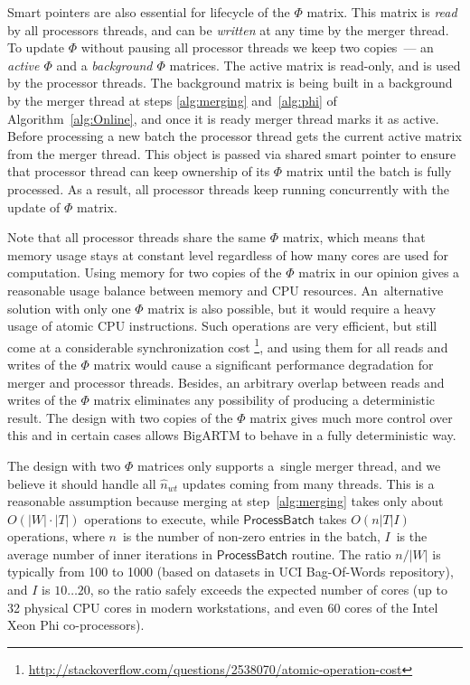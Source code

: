 \documentclass[russian]{llncs}
\newcommand{\kw}[1]{\textsf{#1}}
\begin{document}
Smart pointers are also essential for lifecycle of the $\Phi$ matrix.
This matrix is \emph{read} by all processors threads, and can be \emph{written} at any time by the merger thread.
To update $\Phi$ without pausing all processor threads we keep two copies~--- an \emph{active $\Phi$} and a \emph{background $\Phi$} matrices.
The active matrix is read-only, and is used by the processor threads.
The background matrix is being built in a background by the merger thread
at steps \ref{alg:merging} and~\ref{alg:phi} of Algorithm~\ref{alg:Online},
and once it is ready merger thread marks it as active.
Before processing a new batch the processor thread gets the current active matrix from the merger thread.
This object is passed via shared smart pointer to ensure that processor thread can keep ownership of its $\Phi$ matrix
until the batch is fully processed.
As a result, all processor threads keep running concurrently with the update of $\Phi$ matrix.

Note that all processor threads share the same $\Phi$ matrix,
which means that memory usage stays at constant level regardless of how many cores are used for computation.
Using memory for two copies of the $\Phi$ matrix in our opinion gives a reasonable usage balance between memory and CPU resources.
An~alternative solution with only one $\Phi$ matrix is also possible, but it would require a heavy usage of atomic CPU instructions.
Such operations are very efficient, but still come at a considerable synchronization cost%
\footnote{\url{http://stackoverflow.com/questions/2538070/atomic-operation-cost}},
and using them for all reads and writes of the $\Phi$ matrix would cause a significant performance degradation for merger and processor threads.
Besides, an arbitrary overlap between reads and writes of the $\Phi$ matrix eliminates any possibility of producing a deterministic result.
The design with two copies of the $\Phi$ matrix gives much more control over this
and in certain cases allows BigARTM to behave in a fully deterministic way.

The design with two $\Phi$ matrices only supports a~single merger thread,
and we believe it should handle all $\hat n_{wt}$ updates coming from many threads.
This is a reasonable assumption because
merging at step~\ref{alg:merging} takes only about $O(|W|\cdot|T|)$ operations to execute, while
$\kw{ProcessBatch}$ takes $O(n |T| I)$ operations,
where
$n$~is the number of non-zero entries in the batch,
$I$~is the average number of inner iterations in $\kw{ProcessBatch}$ routine.
The ratio $n / |W|$ is typically from 100 to 1000 (based on datasets in UCI Bag-Of-Words repository),
and $I$ is $10 \dots 20$, so the ratio safely exceeds the expected number of cores
(up to 32 physical CPU cores in modern workstations, and even 60 cores of the Intel Xeon Phi co-processors).
\end{document}
